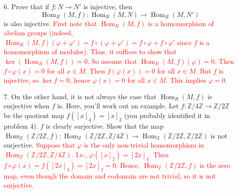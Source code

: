 \documentclass[12pt]{article}
\newcommand{\bbZ}{\mathbb{Z}}
\newcommand{\Hom}{\operatorname{Hom}}
\newcommand{\solution}[1]{\textcolor{red}{#1}}
\begin{document}
\begin{enumerate}
\item[6.] Prove that if $f: N\rightarrow N'$ is injective, then \[{\Hom_R(M,f):
\Hom_R(M,N)\rightarrow \Hom_R(M,N')}\] is also injective. 
\solution{
First note that $\Hom_R(M,f)$ is a
homomorphism of abelian groups (indeed, $\Hom_R(M,f)(\varphi+\varphi')
= f\circ (\varphi + \varphi') = f\circ \varphi + f\circ \varphi'$
since $f$ is a homomorphism of modules). Thus, it suffices to show
that $\ker(\Hom_R(M,f))=0$. So assume that $\Hom_R(M,
f)(\varphi)=0$. Then $f\circ \varphi(x) = 0$ for all $x\in M$. Then
$f(\varphi(x))=0$ for all $x\in M$. But $f$ is injective, so $\ker
f=0$, hence $\varphi(x)=0$ for all $x\in M$. This implies
$\varphi=0$. 
}
\item[7.] On the other hand, it is not always the case that $\Hom_R(M,f)$
  is surjective when $f$ is. Here, you'll work out an example. Let $f: \bbZ/4\bbZ \rightarrow \bbZ/2\bbZ$ be the quotient map
    $f([x]_4)=[x]_2$ (you probably identified it in problem 4). $f$ is
    clearly surjective. Show that the map $\Hom_\bbZ(\bbZ/2\bbZ,f):
    \Hom_\bbZ(\bbZ/2\bbZ,\bbZ/4\bbZ) \rightarrow \Hom_\bbZ(\bbZ/2\bbZ,
    \bbZ/2\bbZ)$ is not surjective.
\solution{Suppose that $\varphi$ is the only non-trivial homomorphism
  in $\Hom_\bbZ(\bbZ/2\bbZ, \bbZ/4\bbZ)$. I.e.,
  $\varphi([x]_2)=[2x]_4$. Then $f\circ\varphi (x) = f([2x]_4) =
  [2x]_2 = 0$. Hence, $\Hom_\bbZ(\bbZ/2\bbZ, f)$ is the zero map, even
  though the domain and codomain are not trivial, so it is not
  surjective. 
}
\end{enumerate}
\end{document}
